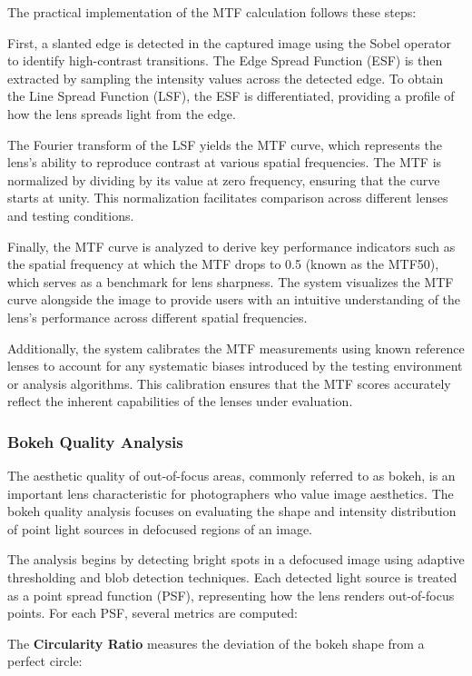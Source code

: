 The practical implementation of the MTF calculation follows these steps:

First, a slanted edge is detected in the captured image using the Sobel operator to identify high-contrast transitions. The Edge Spread Function (ESF) is then extracted by sampling the intensity values across the detected edge. To obtain the Line Spread Function (LSF), the ESF is differentiated, providing a profile of how the lens spreads light from the edge.

The Fourier transform of the LSF yields the MTF curve, which represents the lens's ability to reproduce contrast at various spatial frequencies. The MTF is normalized by dividing by its value at zero frequency, ensuring that the curve starts at unity. This normalization facilitates comparison across different lenses and testing conditions.

Finally, the MTF curve is analyzed to derive key performance indicators such as the spatial frequency at which the MTF drops to 0.5 (known as the MTF50), which serves as a benchmark for lens sharpness. The system visualizes the MTF curve alongside the image to provide users with an intuitive understanding of the lens's performance across different spatial frequencies.

Additionally, the system calibrates the MTF measurements using known reference lenses to account for any systematic biases introduced by the testing environment or analysis algorithms. This calibration ensures that the MTF scores accurately reflect the inherent capabilities of the lenses under evaluation.

\subsubsection{Bokeh Quality Analysis}
The aesthetic quality of out-of-focus areas, commonly referred to as bokeh, is an important lens characteristic for photographers who value image aesthetics. The bokeh quality analysis focuses on evaluating the shape and intensity distribution of point light sources in defocused regions of an image.

The analysis begins by detecting bright spots in a defocused image using adaptive thresholding and blob detection techniques. Each detected light source is treated as a point spread function (PSF), representing how the lens renders out-of-focus points. For each PSF, several metrics are computed:

The \textbf{Circularity Ratio} measures the deviation of the bokeh shape from a perfect circle:

